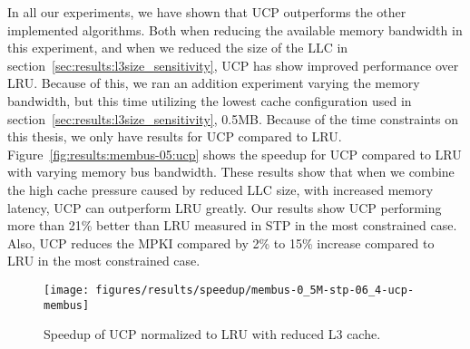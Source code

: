 In all our experiments, we have shown that UCP outperforms the other implemented algorithms.
Both when reducing the available memory bandwidth in this experiment, and when we reduced the size of the LLC in section~\ref{sec:results:l3size_sensitivity}, UCP has show improved performance over LRU.
Because of this, we ran an addition experiment varying the memory bandwidth, but this time utilizing the lowest cache configuration used in section~\ref{sec:results:l3size_sensitivity}, 0.5MB.
Because of the time constraints on this thesis, we only have results for UCP compared to LRU.
Figure~\ref{fig:results:membus-05:ucp} shows the speedup for UCP compared to LRU with varying memory bus bandwidth.
These results show that when we combine the high cache pressure caused by reduced LLC size, with increased memory latency, UCP can outperform LRU greatly.
Our results show UCP performing more than 21\% better than LRU measured in STP in the most constrained case.
Also, UCP reduces the MPKI compared by 2\% to 15\% increase compared to LRU in the most constrained case.

\begin{figure}[!htb]
    \centering
        \texttt{[image: figures/results/speedup/membus-0\_5M-stp-06\_4-ucp-membus]}
        \caption{Speedup of UCP normalized to LRU with reduced L3 cache.}
        \label{fig:results:bus-05:ucp}
\end{figure}